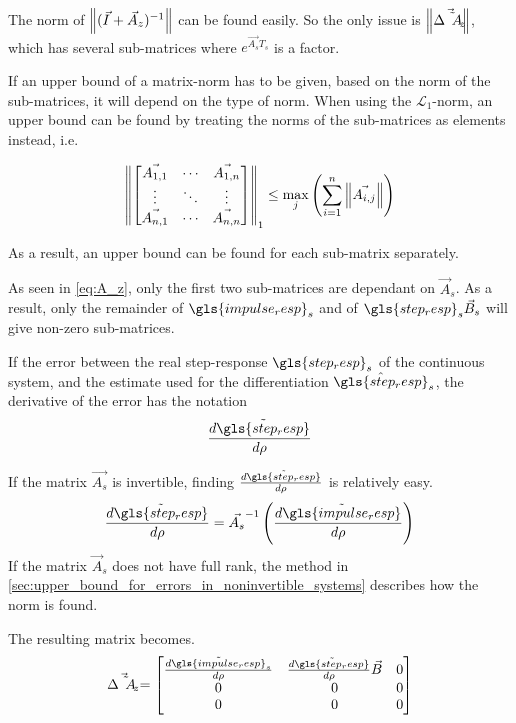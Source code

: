 The norm of $\left\lVert( \Vec{I}+\Vec{A}_z)^{-1}\right\rVert$ can be found easily. So the only issue is $\left\lVert\Vec{\Delta \Tilde{A}_z}\right\rVert$, which has several sub-matrices where $e^{\Vec{A_s}T_s}$ is a factor. 

If an upper bound of a matrix-norm has to be given, based on the norm of the sub-matrices, it will depend on the type of norm. When using the $\mathcal{L}_1$-norm, an upper bound can be found by treating  the norms of the sub-matrices  as elements instead, i.e.

\begin{equation}
 \left\lVert\begin{bmatrix}
 \Vec{A_{1,1}} & \cdots & \Vec{A_{1,n}}\\
 \vdots & \ddots & \vdots \\ 
 \Vec{A_{n,1}} & \cdots & \Vec{A_{n,n}}
 \end{bmatrix}\right\rVert_1
 \leq \max_j \left( \sum_{i=1}^n\left\lVert\Vec{A_{i,j}}\right\rVert\right)
\end{equation}


As a result, an upper bound can be found for each sub-matrix separately. 

\noindent
As seen in \cref{eq:A_z}, only the first two sub-matrices are dependant on $\Vec{A}_s$. As a result, only the remainder of $\gls{impulse_resp}_s$ and of $\gls{step_resp}_s\Vec{B}_s$ will give non-zero sub-matrices. 

If the error between the real step-response $\gls{step_resp}_s$ of the continuous system, and the estimate used for the differentiation $\hat{\gls{step_resp}}_s$, the derivative of the error has the notation
\begin{equation}
 \frac{d \tilde{\gls{step_resp}}}{d\rho}
\end{equation}

If the matrix $\Vec{A_s}$ is invertible, finding $\frac{d \tilde{\gls{step_resp}}}{d\rho}$ is relatively easy.
\begin{equation}
 \frac{d \tilde{\gls{step_resp}}}{d\rho} = \Vec{A_s}^{-1}\left(\frac{d \tilde{\gls{impulse_resp}}}{d\rho}\right)
\end{equation}
If the matrix $\Vec{A}_s$ does not have full rank, the method in \cref{sec:upper_bound_for_errors_in_noninvertible_systems} describes how the norm is found. 

The resulting matrix becomes. 
\begin{equation}
 \Vec{\Delta \tilde{A}_z} = 
 \begin{bmatrix}
 \frac{d\tilde{\gls{impulse_resp}}_s}{d\rho}
 & 
 \frac{d \tilde{\gls{step_resp}}}{d\rho}\Vec{B}
 & 0\\ 
 0&0&0\\
 0&0&0\\
 \end{bmatrix}
\end{equation}


